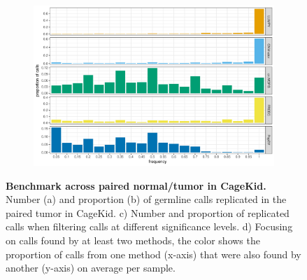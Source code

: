 \begin{figure}[htp]
\begin{subfigure}{.48\textwidth}
    \caption{}
  \end{subfigure}
  \begin{subfigure}{.48\textwidth}
    \includegraphics[width=\linewidth, page=5]{figures/cagekid-benchmark.pdf}
    \caption{}
  \end{subfigure}
  \caption[Benchmark across paired normal/tumor in CageKid]{{\bf Benchmark across paired normal/tumor in CageKid.} {\small Number (a) and proportion (b) of germline calls replicated in the paired tumor in CageKid. c) Number and proportion of replicated calls when filtering calls at different significance levels. d) Focusing on calls found by at least two methods, the color shows the proportion of calls from one method (x-axis) that were also found by another (y-axis) on average per sample. }}
  \label{fig:ckconc}
\end{figure}

